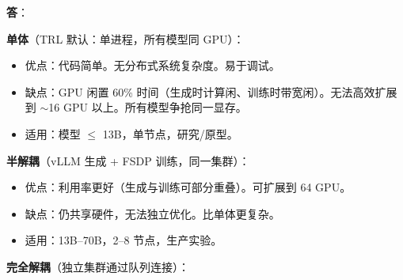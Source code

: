 \begin{questionbox}
\textbf{答}：

\textbf{单体}（TRL 默认：单进程，所有模型同 GPU）：

\begin{itemize}
  \item 优点：代码简单。无分布式系统复杂度。易于调试。
  \item 缺点：GPU 闲置 60\% 时间（生成时计算闲、训练时带宽闲）。无法高效扩展到 $\sim$16 GPU 以上。所有模型争抢同一显存。
  \item 适用：模型 $\leq$ 13B，单节点，研究/原型。
\end{itemize}

\textbf{半解耦}（vLLM 生成 + FSDP 训练，同一集群）：

\begin{itemize}
  \item 优点：利用率更好（生成与训练可部分重叠）。可扩展到 64 GPU。
  \item 缺点：仍共享硬件，无法独立优化。比单体更复杂。
  \item 适用：13B--70B，2--8 节点，生产实验。
\end{itemize}

\textbf{完全解耦}（独立集群通过队列连接）：


\end{questionbox}
